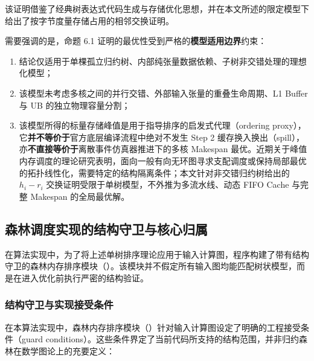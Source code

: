 \documentclass[anonymous,withtoc]{gmcm2026}
\providecommand{\tightlist}{\setlength{\itemsep}{0pt}\setlength{\parskip}{0pt}}
\begin{document}
该证明借鉴了经典树表达式代码生成与存储优化思想\cite{ref4}，并在本文所述的限定模型下给出了按字节度量存储占用的相邻交换证明。

需要强调的是，命题 6.1 证明的最优性受到严格的\textbf{模型适用边界}约束：

\begin{enumerate}
\def\labelenumi{\arabic{enumi}.}
\tightlist
\item
  结论仅适用于单棵孤立归约树、内部纯张量数据依赖、子树非交错处理的理想化模型；
\item
  该模型未考虑多核之间的并行交错、外部输入张量的重叠生命周期、L1 Buffer 与 UB 的独立物理容量分割；
\item
  该模型所得的标量存储峰值是用于指导排序的启发式代理（ordering proxy），它\textbf{并不等价于}官方底层编译流程中绝对不发生 Step 2 缓存换入换出（spill），亦\textbf{不直接等价于}离散事件仿真器推进下的多核 Makespan 最优。近期关于峰值内存调度的理论研究表明，面向一般有向无环图寻求支配调度或保持局部最优的拓扑线性化，需要特定的结构隔离条件\cite{ref10}；本文针对非交错归约树给出的 \(h_i - r_i\) 交换证明受限于单树模型，不外推为多流水线、动态 FIFO Cache 与完整 Makespan 的全局最优解。
\end{enumerate}

\subsection{森林调度实现的结构守卫与核心归属}

在算法实现中，为了将上述单树排序理论应用于输入计算图，程序构建了带有结构守卫的森林内存排序模块（\texttt{}）。该模块并不假定所有输入图均能匹配树状模型，而是在进入优化前执行严密的结构验证。

\subsubsection{结构守卫与实现接受条件}

在本算法实现中，森林内存排序模块（\texttt{}）针对输入计算图设定了明确的工程接受条件（guard conditions）。这些条件界定了当前代码所支持的结构范围，并非归约森林在数学图论上的充要定义：
\end{document}
